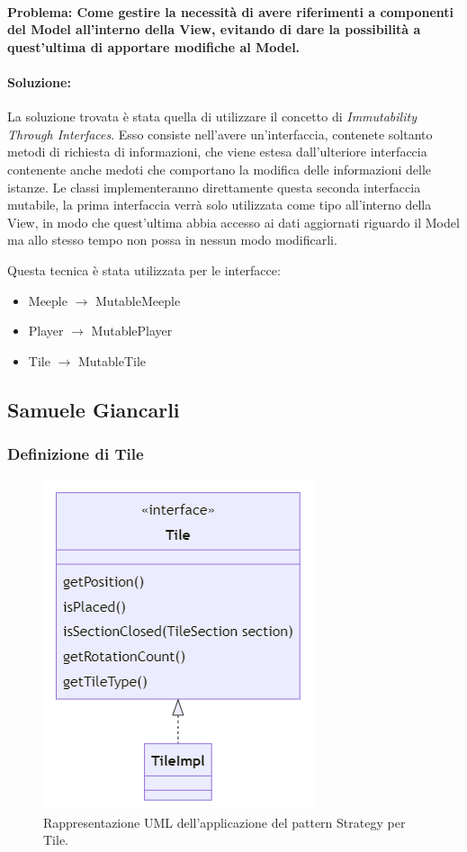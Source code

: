 \paragraph{Problema: Come gestire la necessità di avere riferimenti a componenti del Model all'interno della View, evitando di dare la possibilità a quest'ultima di apportare modifiche al Model.}
\paragraph{Soluzione:}
La soluzione trovata è stata quella di utilizzare il concetto di \textit{Immutability Through Interfaces}. Esso consiste nell'avere un'interfaccia, contenete soltanto metodi di richiesta di informazioni, che viene estesa dall'ulteriore interfaccia contenente anche medoti che comportano la modifica delle informazioni delle istanze. Le classi implementeranno direttamente questa seconda interfaccia mutabile, la prima interfaccia verrà solo utilizzata come tipo all'interno della View, in modo che quest'ultima abbia accesso ai dati aggiornati riguardo il Model ma allo stesso tempo non possa in nessun modo modificarli.

Questa tecnica è stata utilizzata per le interfacce:
\begin{itemize}
    \item Meeple $\rightarrow$ MutableMeeple
    \item Player $\rightarrow$ MutablePlayer
    \item Tile $\rightarrow$ MutableTile
\end{itemize}
\clearpage

\subsection*{Samuele Giancarli}
\subsubsection*{Definizione di Tile}
\begin{figure}[ht]
    \centering\includegraphics[]{images/tile_uml.png}
    \caption{Rappresentazione UML dell'applicazione del pattern Strategy per Tile.}
\end{figure}
